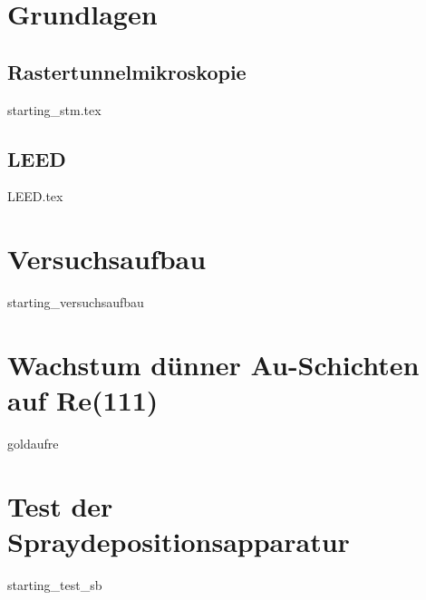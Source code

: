\documentclass[pdftex,a4paper,german,openbib,final,11pt,twoside,chapterprefix,
headsepline]{scrbook}
\begin{document}
\mainmatter  
\sloppy






\chapter{Grundlagen}


\section{Rastertunnelmikroskopie}
{starting_stm.tex}
 \section{LEED}
 {LEED.tex}


 \chapter{Versuchsaufbau} 
 {starting_versuchsaufbau}
 
\chapter{Wachstum dünner Au-Schichten auf Re(111)}
{goldaufre}
 
\chapter{Test der Spraydepositionsapparatur} \label{kaptest}
{starting_test_sb}



% 
% 
\end{document}
